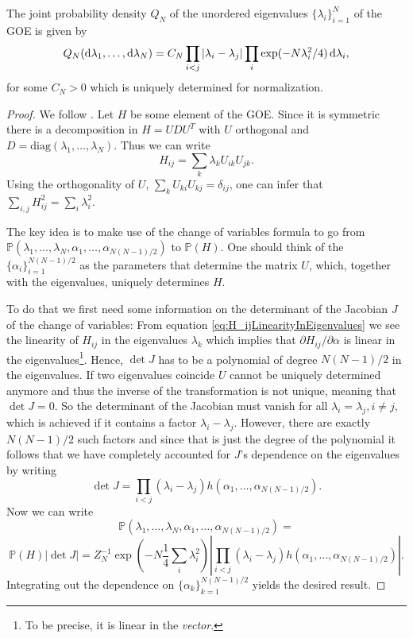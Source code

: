 \begin{theorem}\label{thm:probabilitydensityofEV}
	The joint probability density $Q_N$ of the unordered eigenvalues $\{\lambda_i\}_{i=1}^N$ of the GOE is given by
	$$Q_N(\mathop{}\!\mathrm{d}\lambda_1,\dots,\mathop{}\!\mathrm{d}\lambda_N) = C_N\prod_{i<j}|\lambda_i-\lambda_j|\prod_i\exp(-N\lambda_i^2/4)\mathop{}\!\mathrm{d}\lambda_i,$$
	for some $C_N>0$ which is uniquely determined for normalization.
\end{theorem}
\begin{proof}
	We follow \cite{LiuEigenvalues}.
	Let $H$ be some element of the GOE. Since it is symmetric there is a decomposition in $H=UDU^T$ with $U$ orthogonal and $D=\text{diag}(\lambda_1,\dots,\lambda_N)$. Thus we can write 
	\begin{equation}\label{eq:H_ijLinearityInEigenvalues}
		H_{ij} = \sum_k \lambda_k U_{ik}U_{jk}.
	\end{equation}
	Using the orthogonality of $U$, $\sum_k U_{ki}U_{kj}=\delta_{ij}$, one can infer that $\sum_{i,j}H_{ij}^2=\sum_i \lambda_i^2$.
	
	The key idea is to make use of the change of variables formula to go from $\mathbb P(\lambda_1,\dots,\lambda_N,\alpha_1,\dots,\alpha_{N(N-1)/2})$ to $\mathbb P(H)$. One should think of the $\{\alpha_i\}_{i=1}^{N(N-1)/2}$ as the parameters that determine the matrix $U$, which, together with the eigenvalues, uniquely determines $H$.
	
	To do that we first need some information on the determinant of the Jacobian $J$ of the change of variables:
	From equation \eqref{eq:H_ijLinearityInEigenvalues} we see the linearity of $H_{ij}$ in the eigenvalues $\lambda_k$ which implies that $\partial H_{ij}/\partial\alpha$ is linear in the eigenvalues\footnote{To be precise, it is linear in the \textit{vector}.}. Hence, $\det J$ has to be a polynomial of degree $N(N-1)/2$ in the eigenvalues. If two eigenvalues coincide $U$ cannot be uniquely determined anymore and thus the inverse of the transformation is not unique, meaning that $\det J=0$. So the determinant of the Jacobian must vanish for all $\lambda_i=\lambda_j, i\neq j$, which is achieved if it contains a factor $\lambda_i-\lambda_j$. However, there are exactly $N(N-1)/2$ such factors and since that is just the degree of the polynomial it follows that we have completely accounted for $J$'s dependence on the eigenvalues by writing $$\det J=\prod_{i<j}(\lambda_i-\lambda_j) h(\alpha_1,\dots,\alpha_{N(N-1)/2}).$$
	Now we can write
	$$\mathbb P(\lambda_1,\dots,\lambda_N,\alpha_1,\dots,\alpha_{N(N-1)/2}) = $$
	$$\mathbb P(H)|\det J|=Z_N^{-1}\exp\left(-N\frac{1}{4}\sum_i\lambda_i^2\right)|\prod_{i<j}(\lambda_i-\lambda_j) h(\alpha_1,\dots,\alpha_{N(N-1)/2})|.$$
	Integrating out the dependence on $\{\alpha_k\}_{k=1}^{N(N-1)/2}$ yields the desired result.
\end{proof}


